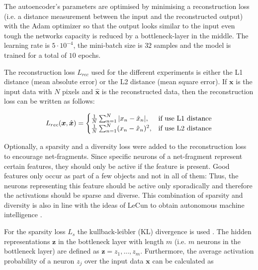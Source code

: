 The autoencoder's parameters are optimised by minimising a reconstruction loss (i.e. a distance measurement between the input and the reconstructed output) with the Adam optimizer  so that the output looks similar to the input even tough the networks capacity is reduced by a bottleneck-layer in the middle.
The learning rate is $5 \cdot 10^{-4}$, the mini-batch size is $32$ samples and the model is trained for a total of $10$ epochs.

The reconstruction loss $L_{rec}$ used for the different experiments is either the L1 distance (mean absolute error) or the L2 distance (mean square error). If $\boldsymbol{x}$ is the input data with $N$ pixels and $\hat{\boldsymbol{x}}$ is the reconstructed data, then the reconstruction loss can be written as follows:

\begin{equation}\eqlbl{ae_recon}
		L_{rec}(\boldsymbol{x}, \hat{\boldsymbol{x}}) = \begin{cases}
      		\frac{1}{N} \sum^{N}_{n=1}|x_n - \hat{x}_n|, & \text{if use L1 distance}\\
      		\frac{1}{N} \sum^{N}_{n=1} (x_n - \hat{x}_n)^2, & \text{if use L2 distance}
    	\end{cases}
\end{equation}


Optionally, a sparsity and a diversity loss were added to the reconstruction loss to encourage net-fragments.
Since specific neurons of a net-fragment represent certain features, they should only be active if the feature is present.
Good features only occur as part of a few objects and not in all of them: Thus, the neurons representing this feature should be active only sporadically and therefore the activations should be sparse and diverse.
This combination of sparsity and diversity is also in line with the ideas of LeCun to obtain autonomous machine intelligence .


For the sparsity loss $L_{s}$ the kullback-leibler (KL) divergence is used .
The hidden representations $\boldsymbol{z}$ in the bottleneck layer with length $m$ (i.e. $m$ neurons in the bottleneck layer) are defined as $\boldsymbol{z} = z_1, ..., z_m$.
Furthermore, the average activation probability of a neuron $z_j$ over the input data $\boldsymbol{x}$ can be calculated as


